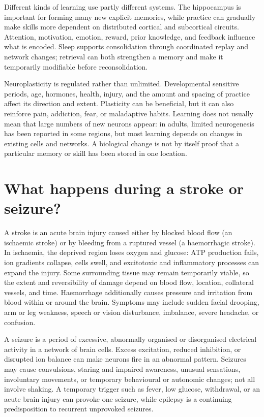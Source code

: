 \documentclass[11pt,oneside]{report}
\begin{document}
Different kinds of learning use partly different systems. The hippocampus is
important for forming many new explicit memories, while practice can gradually
make skills more dependent on distributed cortical and subcortical circuits.
Attention, motivation, emotion, reward, prior knowledge, and feedback influence
what is encoded. Sleep supports consolidation through coordinated replay and
network changes; retrieval can both strengthen a memory and make it temporarily
modifiable before reconsolidation.

Neuroplasticity is regulated rather than unlimited. Developmental sensitive
periods, age, hormones, health, injury, and the amount and spacing of practice
affect its direction and extent. Plasticity can be beneficial, but it can also
reinforce pain, addiction, fear, or maladaptive habits. Learning does not usually
mean that large numbers of new neurons appear: in adults, limited
neurogenesis has been reported in some regions, but most learning depends on
changes in existing cells and networks. A biological change is not by itself
proof that a particular memory or skill has been stored in one location.

\section{What happens during a stroke or seizure?}

A stroke is an acute brain injury caused either by blocked blood flow (an
ischaemic stroke) or by bleeding from a ruptured vessel (a haemorrhagic stroke).
In ischaemia, the deprived region loses oxygen and glucose: ATP production
fails, ion gradients collapse, cells swell, and excitotoxic and inflammatory
processes can expand the injury. Some surrounding tissue may remain temporarily
viable, so the extent and reversibility of damage depend on blood flow, location,
collateral vessels, and time. Haemorrhage additionally causes pressure and
irritation from blood within or around the brain. Symptoms may include sudden
facial drooping, arm or leg weakness, speech or vision disturbance, imbalance,
severe headache, or confusion.

A seizure is a period of excessive, abnormally organised or disorganised
electrical activity in a network of brain cells. Excess excitation, reduced
inhibition, or disrupted ion balance can make neurons fire in an abnormal
pattern. Seizures may cause convulsions, staring and impaired awareness,
unusual sensations, involuntary movements, or temporary behavioural or
autonomic changes; not all involve shaking. A temporary trigger such as fever,
low glucose, withdrawal, or an acute brain injury can provoke one seizure, while
epilepsy is a continuing predisposition to recurrent unprovoked seizures.
\end{document}
